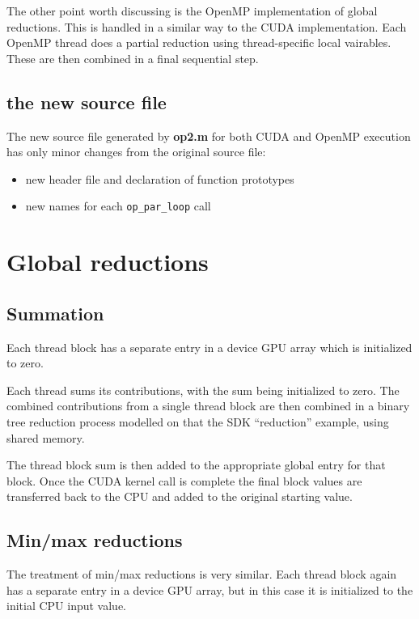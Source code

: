 \documentclass[12pt]{article}
\begin{document}
The other point worth discussing is the OpenMP implementation of
global reductions.  This is handled in a similar way to the CUDA
implementation.  Each OpenMP thread does a partial reduction using
thread-specific local vairables.  These are then combined in a final
sequential step.

\subsection{the new source file}

The new source file generated by {\bf op2.m} for both CUDA and OpenMP
execution has only minor changes from the original source file:
\begin{itemize}
\item
new header file and declaration of function prototypes

\item
new names for each {\tt op\_par\_loop} call
\end{itemize}

\newpage

\section{Global reductions}

\subsection{Summation}

Each thread block has a separate entry in a device GPU array which is
initialized to zero.

Each thread sums its contributions, with the sum being initialized to zero.
The combined contributions from a single thread block are then combined
in a binary tree reduction process modelled on that the SDK ``reduction''
example, using shared memory.

The thread block sum is then added to the appropriate global entry for that
block.  Once the CUDA kernel call is complete the final block values are
transferred back to the CPU and added to the original starting value.

\subsection{Min/max reductions}

The treatment of min/max reductions is very similar. Each thread block
again has a separate entry in a device GPU array, but in this case
it is initialized to the initial CPU input value.
\end{document}
